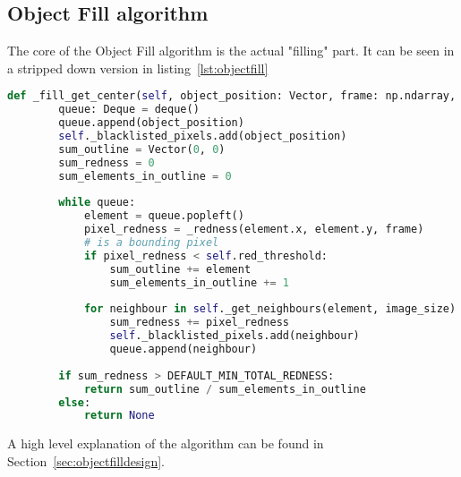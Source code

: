 \subsection{Object Fill algorithm}\label{solution:objfillalgo}

The core of the Object Fill algorithm is the actual "filling" part.
It can be seen in a stripped down version in listing~\ref{lst:objectfill}

\begin{lstlisting}[language=Python,label={lst:objectfill},caption={Stripped down version of object fill from object\_fill.py}]
    def _fill_get_center(self, object_position: Vector, frame: np.ndarray, image_size: Vector) -> Optional[Vector]:
	    queue: Deque = deque()
	    queue.append(object_position)
	    self._blacklisted_pixels.add(object_position)
	    sum_outline = Vector(0, 0)
	    sum_redness = 0
	    sum_elements_in_outline = 0
	    
	    while queue:
		    element = queue.popleft()
		    pixel_redness = _redness(element.x, element.y, frame)
		    # is a bounding pixel
		    if pixel_redness < self.red_threshold:
			    sum_outline += element
			    sum_elements_in_outline += 1
		    
		    for neighbour in self._get_neighbours(element, image_size) - self._blacklisted_pixels:
			    sum_redness += pixel_redness
			    self._blacklisted_pixels.add(neighbour)
			    queue.append(neighbour)
	    
	    if sum_redness > DEFAULT_MIN_TOTAL_REDNESS:
		    return sum_outline / sum_elements_in_outline
	    else:
		    return None
\end{lstlisting}

A high level explanation of the algorithm can be found in Section~\ref{sec:objectfilldesign}.